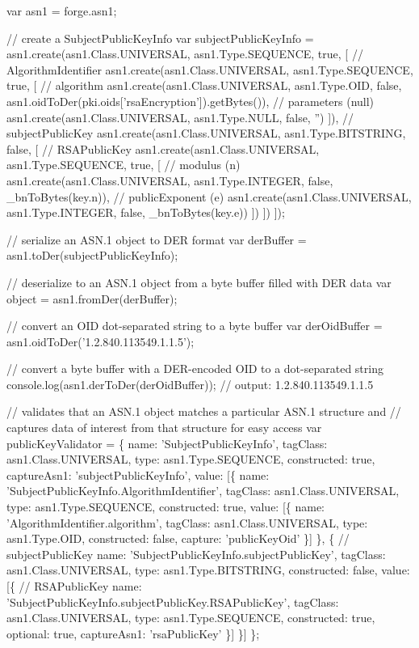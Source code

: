 \begin{DoxyCode}
var asn1 = forge.asn1;

// create a SubjectPublicKeyInfo
var subjectPublicKeyInfo =
  asn1.create(asn1.Class.UNIVERSAL, asn1.Type.SEQUENCE, true, [
    // AlgorithmIdentifier
    asn1.create(asn1.Class.UNIVERSAL, asn1.Type.SEQUENCE, true, [
      // algorithm
      asn1.create(asn1.Class.UNIVERSAL, asn1.Type.OID, false,
        asn1.oidToDer(pki.oids['rsaEncryption']).getBytes()),
      // parameters (null)
      asn1.create(asn1.Class.UNIVERSAL, asn1.Type.NULL, false, '')
    ]),
    // subjectPublicKey
    asn1.create(asn1.Class.UNIVERSAL, asn1.Type.BITSTRING, false, [
      // RSAPublicKey
      asn1.create(asn1.Class.UNIVERSAL, asn1.Type.SEQUENCE, true, [
        // modulus (n)
        asn1.create(asn1.Class.UNIVERSAL, asn1.Type.INTEGER, false,
          \_bnToBytes(key.n)),
        // publicExponent (e)
        asn1.create(asn1.Class.UNIVERSAL, asn1.Type.INTEGER, false,
          \_bnToBytes(key.e))
      ])
    ])
  ]);

// serialize an ASN.1 object to DER format
var derBuffer = asn1.toDer(subjectPublicKeyInfo);

// deserialize to an ASN.1 object from a byte buffer filled with DER data
var object = asn1.fromDer(derBuffer);

// convert an OID dot-separated string to a byte buffer
var derOidBuffer = asn1.oidToDer('1.2.840.113549.1.1.5');

// convert a byte buffer with a DER-encoded OID to a dot-separated string
console.log(asn1.derToDer(derOidBuffer));
// output: 1.2.840.113549.1.1.5

// validates that an ASN.1 object matches a particular ASN.1 structure and
// captures data of interest from that structure for easy access
var publicKeyValidator = \{
  name: 'SubjectPublicKeyInfo',
  tagClass: asn1.Class.UNIVERSAL,
  type: asn1.Type.SEQUENCE,
  constructed: true,
  captureAsn1: 'subjectPublicKeyInfo',
  value: [\{
    name: 'SubjectPublicKeyInfo.AlgorithmIdentifier',
    tagClass: asn1.Class.UNIVERSAL,
    type: asn1.Type.SEQUENCE,
    constructed: true,
    value: [\{
      name: 'AlgorithmIdentifier.algorithm',
      tagClass: asn1.Class.UNIVERSAL,
      type: asn1.Type.OID,
      constructed: false,
      capture: 'publicKeyOid'
    \}]
  \}, \{
    // subjectPublicKey
    name: 'SubjectPublicKeyInfo.subjectPublicKey',
    tagClass: asn1.Class.UNIVERSAL,
    type: asn1.Type.BITSTRING,
    constructed: false,
    value: [\{
      // RSAPublicKey
      name: 'SubjectPublicKeyInfo.subjectPublicKey.RSAPublicKey',
      tagClass: asn1.Class.UNIVERSAL,
      type: asn1.Type.SEQUENCE,
      constructed: true,
      optional: true,
      captureAsn1: 'rsaPublicKey'
    \}]
  \}]
\};


\end{DoxyCode}
